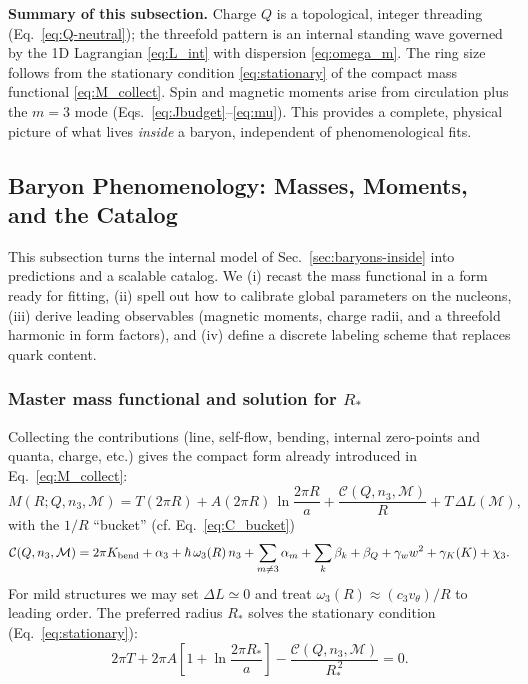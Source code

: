 \medskip
\noindent\textbf{Summary of this subsection.}
Charge $Q$ is a topological, integer threading (Eq.~\eqref{eq:Q-neutral}); the threefold pattern is an internal standing wave governed by the 1D Lagrangian \eqref{eq:L_int} with dispersion \eqref{eq:omega_m}. The ring size follows from the stationary condition \eqref{eq:stationary} of the compact mass functional \eqref{eq:M_collect}. Spin and magnetic moments arise from circulation plus the $m{=}3$ mode (Eqs.~\eqref{eq:Jbudget}--\eqref{eq:mu}). This provides a complete, physical picture of what lives \emph{inside} a baryon, independent of phenomenological fits.

\subsection{Baryon Phenomenology: Masses, Moments, and the Catalog}
\label{sec:baryons-phenomenology}

This subsection turns the internal model of Sec.~\ref{sec:baryons-inside} into predictions and a scalable catalog. We (i) recast the mass functional in a form ready for fitting, (ii) spell out how to calibrate global parameters on the nucleons, (iii) derive leading observables (magnetic moments, charge radii, and a threefold harmonic in form factors), and (iv) define a discrete labeling scheme that replaces quark content.

\subsubsection{Master mass functional and solution for $R_\ast$}
\label{sec:baryons-phenomenology:master}

Collecting the contributions (line, self-flow, bending, internal zero-points and quanta, charge, etc.) gives the compact form already introduced in Eq.~\eqref{eq:M_collect}:
\begin{equation}
M(R;Q,n_3,\mathcal M)
= T(2\pi R) + A(2\pi R)\,\ln\!\frac{2\pi R}{a} + \frac{\mathcal C(Q,n_3,\mathcal M)}{R} + T\,\Delta L(\mathcal M),
\label{eq:masterM}
\end{equation}
with the $1/R$ ``bucket'' (cf. Eq.~\eqref{eq:C_bucket})
\begin{equation}
\mathcal C(Q,n_3,\mathcal M)
= 2\pi K_{\rm bend} + \alpha_3 + \hbar\,\omega_3(R)\,n_3 + \sum_{m\neq 3}\alpha_m + \sum_{k}\beta_k + \beta_Q + \gamma_w w^2 + \gamma_K(K) + \chi_3.
\label{eq:Cbucket}
\end{equation}
For mild structures we may set $\Delta L\simeq 0$ and treat $\omega_3(R)\approx (c_3 v_\theta)/R$ to leading order. The preferred radius $R_\ast$ solves the stationary condition (Eq.~\eqref{eq:stationary}):
\begin{equation}
2\pi T + 2\pi A\!\left[1+\ln\!\frac{2\pi R_\ast}{a}\right] - \frac{\mathcal C(Q,n_3,\mathcal M)}{R_\ast^{\,2}}=0.
\label{eq:Rstar-eq}
\end{equation}

